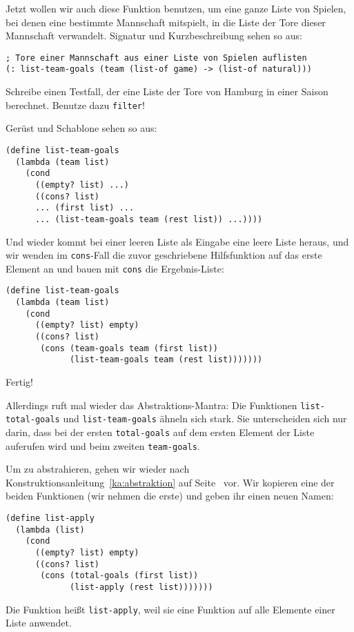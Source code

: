 %
Jetzt wollen wir auch diese Funktion benutzen, um eine ganze Liste von
Spielen, bei denen eine bestimmte Mannschaft mitspielt, in die Liste
der Tore dieser Mannschaft verwandelt.  Signatur und Kurzbeschreibung
sehen so aus:
%
\begin{lstlisting}
; Tore einer Mannschaft aus einer Liste von Spielen auflisten
(: list-team-goals (team (list-of game) -> (list-of natural)))
\end{lstlisting}
%
\begin{aufgabeinline}
  Schreibe einen Testfall, der eine Liste der Tore von Hamburg in
  einer Saison berechnet.  Benutze dazu \lstinline{filter}! 
\end{aufgabeinline}
%
Gerüst und Schablone sehen so aus:
%
\begin{lstlisting}
(define list-team-goals
  (lambda (team list)
    (cond
      ((empty? list) ...)
      ((cons? list)
      ... (first list) ...
      ... (list-team-goals team (rest list)) ...))))
\end{lstlisting}
%
Und wieder kommt bei einer leeren Liste als Eingabe eine leere Liste
heraus, und wir wenden im \lstinline{cons}-Fall die zuvor geschriebene
Hilfsfunktion auf das erste Element an und bauen mit \lstinline{cons}
die Ergebnis-Liste:
%
\begin{lstlisting}
(define list-team-goals
  (lambda (team list)
    (cond
      ((empty? list) empty)
      ((cons? list)
       (cons (team-goals team (first list))
             (list-team-goals team (rest list)))))))
\end{lstlisting}
%
Fertig!

Allerdings ruft mal wieder das Abstraktions-Mantra: Die Funktionen
\lstinline{list-total-goals} und \lstinline{list-team-goals} ähneln
sich stark.  Sie unterscheiden sich nur darin, dass bei der ersten
\lstinline{total-goals} auf dem ersten Element der Liste auferufen wird
und beim zweiten \lstinline{team-goals}. 

Um zu abstrahieren, gehen wir wieder nach
Konstruktionsanleitung~\ref{ka:abstraktion} auf
Seite~\pageref{ka:abstraktion} vor.  Wir kopieren eine der beiden
Funktionen (wir nehmen die erste) und geben ihr einen neuen Namen:
%
\begin{lstlisting}
(define list-apply
  (lambda (list)
    (cond
      ((empty? list) empty)
      ((cons? list)
       (cons (total-goals (first list))
             (list-apply (rest list)))))))
\end{lstlisting}
%
Die Funktion heißt \lstinline{list-apply}, weil sie eine Funktion auf
alle Elemente einer Liste anwendet.

